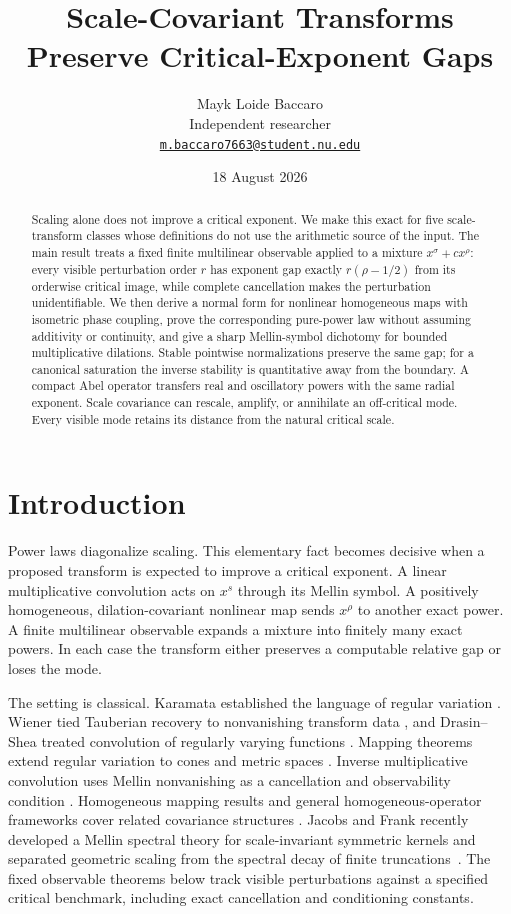\documentclass[11pt,a4paper]{amsart}
\title[Critical-exponent preservation]{Scale-Covariant Transforms Preserve Critical-Exponent Gaps}
\author[Mayk Loide Baccaro]{Mayk Loide Baccaro\\
Independent researcher\\
\href{mailto:m.baccaro7663@student.nu.edu}{\texttt{m.baccaro7663@student.nu.edu}}}
\date{18 August 2026}
\theoremstyle{definition}
\begin{document}
\begin{abstract}
Scaling alone does not improve a critical exponent.  We make this exact for
five scale-transform classes whose
definitions do not use the arithmetic source of the input.  The main result
treats a fixed finite multilinear observable applied to a mixture
$x^\sigma+c x^\rho$: every visible perturbation order $r$ has exponent gap
exactly $r(\rho-1/2)$ from its orderwise critical image, while complete
cancellation makes the perturbation unidentifiable.  We then derive a normal
form for nonlinear homogeneous maps with isometric phase coupling, prove the
corresponding pure-power law without assuming additivity or continuity, and
give a sharp Mellin-symbol dichotomy for bounded multiplicative dilations.
Stable pointwise normalizations preserve the same gap; for a canonical
saturation the inverse stability is quantitative away from the boundary.
A compact Abel operator transfers real and oscillatory powers with the same
radial exponent.  Scale covariance can rescale, amplify, or annihilate an
off-critical mode.  Every visible mode retains its distance from the natural
critical scale.
\end{abstract}

\maketitle

\section{Introduction}

Power laws diagonalize scaling.  This elementary fact becomes decisive when a proposed transform is expected to improve a critical exponent.  A linear multiplicative convolution acts on $x^s$ through its Mellin symbol.  A positively homogeneous, dilation-covariant nonlinear map sends $x^\rho$ to another exact power.  A finite multilinear observable expands a mixture into finitely many exact powers.  In each case the transform either preserves a computable relative gap or loses the mode.

The setting is classical.  Karamata established the language of regular variation \cite{Karamata1930}.  Wiener tied Tauberian recovery to nonvanishing transform data \cite{Wiener1932}, and Drasin--Shea treated convolution of regularly varying functions \cite{DrasinShea1976}.  Mapping theorems extend regular variation to cones and metric spaces \cite{HultLindskog2006}.  Inverse multiplicative convolution uses Mellin nonvanishing as a cancellation and observability condition \cite{JacobsenEtAl2009,DamekEtAl2014}.  Homogeneous mapping results and general homogeneous-operator frameworks cover related covariance structures \cite{DyszewskiMikosch2020,AvetisyanKarapetyants2021}.  Jacobs and Frank recently developed a Mellin spectral theory for scale-invariant symmetric kernels and separated geometric scaling from the spectral decay of finite truncations~\cite{JacobsFrank2026}.  The fixed observable theorems below track visible perturbations against a specified critical benchmark, including exact cancellation and conditioning constants.
\end{document}

